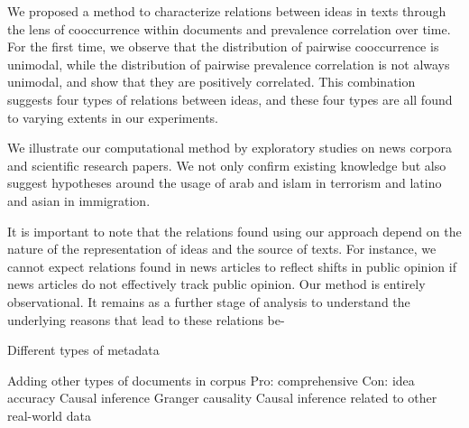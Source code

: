 \documentclass{article}
\begin{document}
We proposed a method to characterize relations between ideas in texts through the lens of cooccurrence within documents and prevalence correlation over time. For the first time, we observe that the distribution of pairwise cooccurrence is unimodal, while the distribution of pairwise prevalence correlation is not always unimodal, and show that they are positively correlated. This combination suggests four types of relations between ideas, and these four types are all found to varying extents in our experiments.

We illustrate our computational method by exploratory studies on news corpora and scientific research papers. We not only confirm existing knowledge but also suggest hypotheses around the usage of arab and islam in terrorism and latino and asian in immigration.

It is important to note that the relations found using our approach depend on the nature of the representation of ideas and the source of texts. For instance, we cannot expect relations found in news articles to reflect shifts in public opinion if news articles do not effectively track public opinion. Our method is entirely observational. It remains as a further stage of analysis to understand the underlying reasons that lead to these relations be-





Different types of metadata 

Adding other types of documents in corpus
Pro: comprehensive
Con: idea accuracy
Causal inference 
Granger causality 
Causal inference related to other real-world data 




















\end{document}
